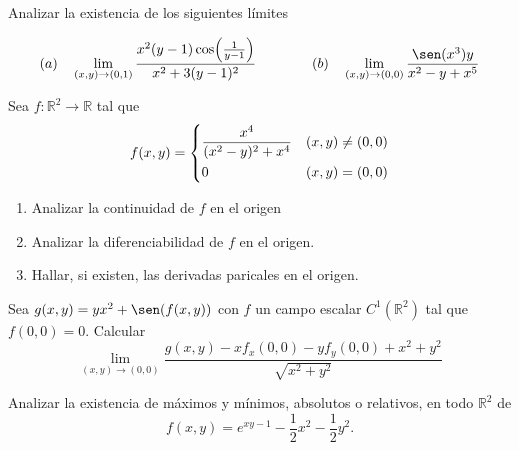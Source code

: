 
\begin{question}
    Analizar la existencia de los siguientes límites

    \[
        (a) \quad \lim_{(x,y)\to(0,1)} \frac{x^2(y-1)\cos(\frac{1}{y-1})}{x^2+3(y-1)^2}
        \hfill
        \qquad\qquad(b) \quad \lim_{(x,y)\to(0,0)} \frac{\sen(x^3)y}{x^2-y+x^5}
    \]

\end{question}


\begin{question}
    Sea \(f: \mathbb{R}^2 \to \mathbb{R}\) tal que
    \[
        f(x,y) =
        \begin{dcases}
            \frac{x^4}{(x^2-y)^2+x^4} & (x,y) \neq (0,0) \\
            0                         & (x,y) = (0,0)
        \end{dcases}
    \]
    \begin{enumerate}
        \item Analizar la continuidad de $f$ en el origen
        \item Analizar la diferenciabilidad de $f$ en el origen.
        \item Hallar, si existen, las derivadas paricales en el origen.
    \end{enumerate}
\end{question}


\begin{question}
    Sea \(g(x,y) = yx^2+\sen(f(x,y))\) con $f$ un campo escalar \(C^1(\mathbb{R}^2)\) tal que \(f(0,0)=0\). Calcular
    \[
        \lim_{(x,y)\to(0,0)} \frac{g(x,y)-xf_x(0,0)-yf_y(0,0)+x^2+y^2}{\sqrt{x^2+y^2}}
    \]
\end{question}


\begin{question}
    Analizar la existencia de máximos y mínimos, absolutos o relativos, en todo $\mathbb{R}^2$ de
    \[
        f(x,y) = e^{xy-1}-\frac{1}{2}x^2-\frac{1}{2}y^2.
    \]
\end{question}

\newpage

